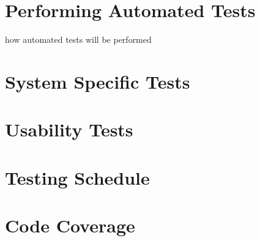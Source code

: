 \documentclass{article}
\begin{document}
\section{Performing Automated Tests}
how automated tests will be performed

\section{System Specific Tests}

\section{Usability Tests}

\section{Testing Schedule}

\section{Code Coverage}
\end{document}
